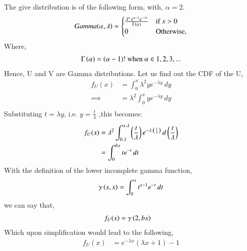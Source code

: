 \documentclass[journal,12pt,twocolumn]{IEEEtran}
\theoremstyle{remark}
\begin{document}
%

\solution 
The give distribution is of the following form, with, $\alpha = 2$. 
\begin{align}
Gamma(\alpha,\lambda) = 
\begin{cases}
\frac{\lambda^{\alpha}x^{\alpha-1}e^{-\lambda x}}{\Gamma\left(\alpha\right)} & \text{if } x > 0\\
0 & \text{Otherwise,}
\end{cases} 
\end{align}
Where, 
\begin{align}
\Gamma\left(\alpha\right) = \left(\alpha - 1\right)! \text{ when } \alpha \in {1,2,3,...}
\end{align}
Hence, U and V are Gamma distributions. Let us find out the CDF of the U,
\begin{align}
f_{U}(x) %
 &= \int_{0}^{x} \lambda^{2}ye^{-\lambda y} \, dy\\
\implies &= \lambda^{2} \int_{0}^{x} ye^{-\lambda y} \, dy\\						
\end{align}
Substituting $t = \lambda y$, i.e. $y= \frac{t}{\lambda}$ ,this becomes:
\begin{align}
f_{U}(x) &= \lambda^{2} \int_{0.\lambda}^{x.\lambda} \left(\frac{t}{\lambda}\right) e^{-\lambda.\left(\frac{t}{\lambda}\right)} \, d\left(\frac{t}{\lambda}\right)\\
&= \int_{0}^{bx} t e^{-t} \,dt\\
\end{align}
With the definition of the lower incomplete gamma function,
\begin{align}
\gamma \left(s,x\right) = \int_{0}^{x} t^{s-1}e^{-t} \, dt\\
\end{align}
we can say that,
\begin{align}
f_{U}(x) &= \gamma \left(2,bx\right)
\end{align}
Which upon simplification would lead to the following,
\begin{align}
f_{U}(x) &= e^{- \lambda x } (\lambda x + 1) -1
\end{align}
\end{document}
